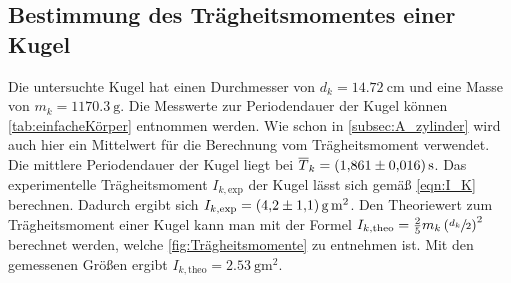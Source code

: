 \subsection{Bestimmung des Trägheitsmomentes einer Kugel}
\label{subsec:A_kugel}
Die untersuchte Kugel hat einen Durchmesser von $d_k = \qty{14.72}{\centi\metre}$ und eine Masse von $m_k = \qty{1170.3}{\gram}$. Die Messwerte zur Periodendauer der Kugel
können \autoref{tab:einfacheKörper} entnommen werden. Wie schon in \autoref{subsec:A_zylinder} wird auch hier ein Mittelwert für die Berechnung vom Trägheitsmoment
verwendet. Die mittlere Periodendauer der Kugel liegt bei $\overline{T}_k = \qty{1.861+-0.016}{\second}$. Das experimentelle Trägheitsmoment $I_{k,\text{exp}}$ der Kugel 
lässt sich gemäß \autoref{eqn:I_K} berechnen. Dadurch ergibt sich $I_{k,\text{exp}} = \qty{4.2+-1.1}{\gram\metre\squared}$. Den Theoriewert zum Trägheitsmoment einer Kugel
kann man mit der Formel $I_{k,\text{theo}} = \frac{2}{5}m_k\left(\sfrac{d_k}{2}\right)^2$ berechnet werden, welche \autoref{fig:Trägheitsmomente} zu entnehmen ist.
Mit den gemessenen Größen ergibt $I_{k,\text{theo}} = \qty{2.53}{\gram\metre\squared}$. 
